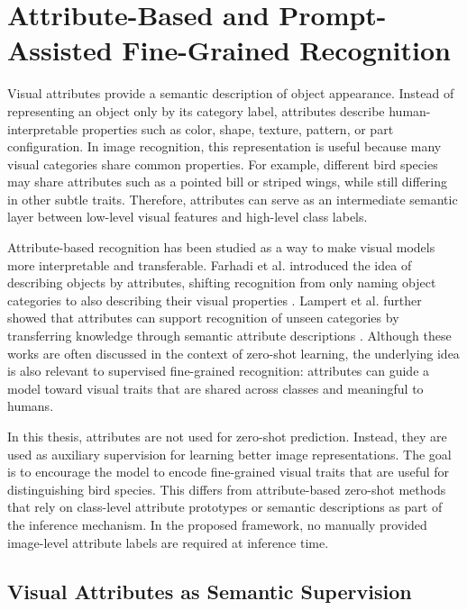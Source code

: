 \section{Attribute-Based and Prompt-Assisted Fine-Grained Recognition}

Visual attributes provide a semantic description of object appearance. Instead of representing an object only by its category label, attributes describe human-interpretable properties such as color, shape, texture, pattern, or part configuration. In image recognition, this representation is useful because many visual categories share common properties. For example, different bird species may share attributes such as a pointed bill or striped wings, while still differing in other subtle traits. Therefore, attributes can serve as an intermediate semantic layer between low-level visual features and high-level class labels.

Attribute-based recognition has been studied as a way to make visual models more interpretable and transferable. Farhadi et al. introduced the idea of describing objects by attributes, shifting recognition from only naming object categories to also describing their visual properties \cite{farhadi2009attributes}. Lampert et al. further showed that attributes can support recognition of unseen categories by transferring knowledge through semantic attribute descriptions \cite{lampert2009attributetransfer, lampert2014attributebased}. Although these works are often discussed in the context of zero-shot learning, the underlying idea is also relevant to supervised fine-grained recognition: attributes can guide a model toward visual traits that are shared across classes and meaningful to humans.

In this thesis, attributes are not used for zero-shot prediction. Instead, they are used as auxiliary supervision for learning better image representations. The goal is to encourage the model to encode fine-grained visual traits that are useful for distinguishing bird species. This differs from attribute-based zero-shot methods that rely on class-level attribute prototypes or semantic descriptions as part of the inference mechanism. In the proposed framework, no manually provided image-level attribute labels are required at inference time.


\subsection{Visual Attributes as Semantic Supervision}

